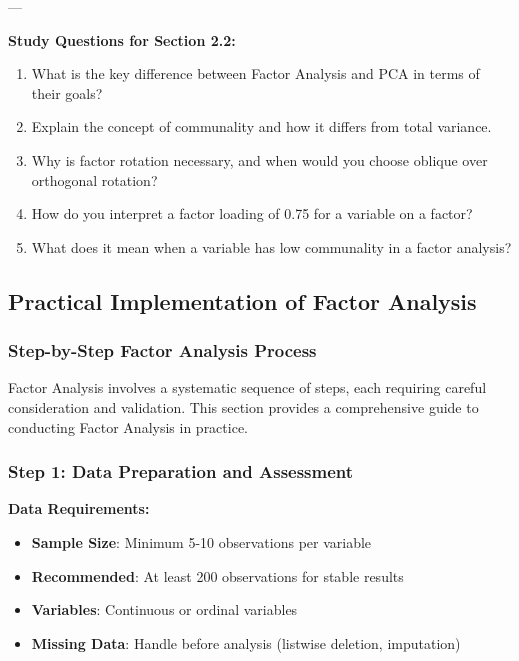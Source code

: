 \documentclass[
]{article}
\begin{document}
---

\textbf{Study Questions for Section 2.2:}

\begin{enumerate}
\item
  What is the key difference between Factor Analysis and PCA in terms of
  their goals?
\item
  Explain the concept of communality and how it differs from total
  variance.
\item
  Why is factor rotation necessary, and when would you choose oblique
  over orthogonal rotation?
\item
  How do you interpret a factor loading of 0.75 for a variable on a
  factor?
\item
  What does it mean when a variable has low communality in a factor
  analysis?
\end{enumerate}

\subsection{Practical Implementation of Factor Analysis}

\subsubsection{Step-by-Step Factor Analysis Process}

Factor Analysis involves a systematic sequence of steps, each requiring
careful consideration and validation. This section provides a
comprehensive guide to conducting Factor Analysis in practice.

\subsubsection{Step 1: Data Preparation and Assessment}

\textbf{Data Requirements:}

\begin{itemize}
\item
  \textbf{Sample Size}: Minimum 5-10 observations per variable
\item
  \textbf{Recommended}: At least 200 observations for stable results
\item
  \textbf{Variables}: Continuous or ordinal variables
\item
  \textbf{Missing Data}: Handle before analysis (listwise deletion,
  imputation)
\end{itemize}
\end{document}

